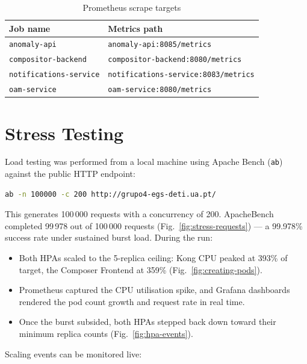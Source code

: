 \documentclass[12pt,a4paper,oneside]{report}
\begin{document}
\begin{table}[H]
\centering
\caption{Prometheus scrape targets}
\label{tab:prometheus}
\renewcommand{\arraystretch}{1.3}
\begin{tabular}{l l}
\toprule
\textbf{Job name} & \textbf{Metrics path} \\
\midrule
\texttt{anomaly-api}           & \texttt{anomaly-api:8085/metrics} \\
\texttt{compositor-backend}    & \texttt{compositor-backend:8080/metrics} \\
\texttt{notifications-service} & \texttt{notifications-service:8083/metrics} \\
\texttt{oam-service}           & \texttt{oam-service:8080/metrics} \\
\bottomrule
\end{tabular}
\end{table}

\section{Stress Testing}
\label{sec:stress}

Load testing was performed from a local machine using Apache Bench (\texttt{ab}) against the public HTTP endpoint:

\begin{lstlisting}[language=bash, caption=Stress test command]
ab -n 100000 -c 200 http://grupo4-egs-deti.ua.pt/
\end{lstlisting}

This generates 100\,000 requests with a concurrency of 200. ApacheBench completed 99\,978 out of 100\,000 requests (Fig.~\ref{fig:stress-requests}) — a 99.978\% success rate under sustained burst load. During the run:

\begin{itemize}[noitemsep]
  \item Both HPAs scaled to the 5-replica ceiling: Kong CPU peaked at 393\% of target, the Composer Frontend at 359\% (Fig.~\ref{fig:creating-pods}).
  \item Prometheus captured the CPU utilisation spike, and Grafana dashboards rendered the pod count growth and request rate in real time.
  \item Once the burst subsided, both HPAs stepped back down toward their minimum replica counts (Fig.~\ref{fig:hpa-events}).
\end{itemize}

Scaling events can be monitored live:
\end{document}
